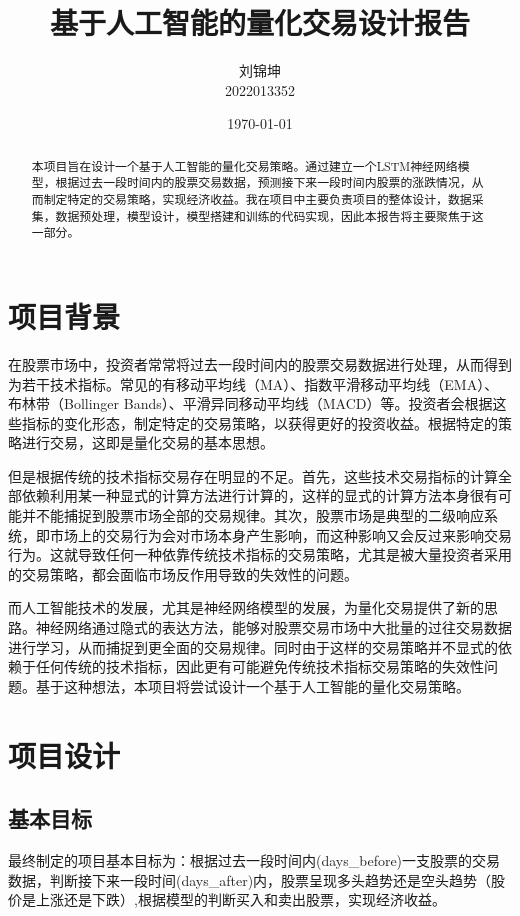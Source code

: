 \documentclass[UTF8]{ctexart}
\title{基于人工智能的量化交易设计报告}
\author{
    刘锦坤
    \\2022013352}
\date{\today}
\begin{document}
\fancyfoot[C]{\thepage}

\maketitle
\begin{abstract}
    本项目旨在设计一个基于人工智能的量化交易策略。通过建立一个LSTM神经网络模型，根据过去一段时间内的股票交易数据，预测接下来一段时间内股票的涨跌情况，从而制定特定的交易策略，实现经济收益。我在项目中主要负责项目的整体设计，数据采集，数据预处理，模型设计，模型搭建和训练的代码实现，因此本报告将主要聚焦于这一部分。
\end{abstract}
\tableofcontents
\newpage

\section{项目背景}
在股票市场中，投资者常常将过去一段时间内的股票交易数据进行处理，从而得到为若干技术指标。常见的有移动平均线（MA）、指数平滑移动平均线（EMA）、布林带（Bollinger Bands）、平滑异同移动平均线（MACD）等。投资者会根据这些指标的变化形态，制定特定的交易策略，以获得更好的投资收益。根据特定的策略进行交易，这即是量化交易的基本思想。

但是根据传统的技术指标交易存在明显的不足。首先，这些技术交易指标的计算全部依赖利用某一种显式的计算方法进行计算的，这样的显式的计算方法本身很有可能并不能捕捉到股票市场全部的交易规律。其次，股票市场是典型的二级响应系统，即市场上的交易行为会对市场本身产生影响，而这种影响又会反过来影响交易行为。这就导致任何一种依靠传统技术指标的交易策略，尤其是被大量投资者采用的交易策略，都会面临市场反作用导致的失效性的问题。

而人工智能技术的发展，尤其是神经网络模型的发展，为量化交易提供了新的思路。神经网络通过隐式的表达方法，能够对股票交易市场中大批量的过往交易数据进行学习，从而捕捉到更全面的交易规律。同时由于这样的交易策略并不显式的依赖于任何传统的技术指标，因此更有可能避免传统技术指标交易策略的失效性问题。基于这种想法，本项目将尝试设计一个基于人工智能的量化交易策略。

\section{项目设计}
\subsection{基本目标}
最终制定的项目基本目标为：根据过去一段时间内(days\_before)一支股票的交易数据，判断接下来一段时间(days\_after)内，股票呈现多头趋势还是空头趋势（股价是上涨还是下跌）,根据模型的判断买入和卖出股票，实现经济收益。
\end{document}
